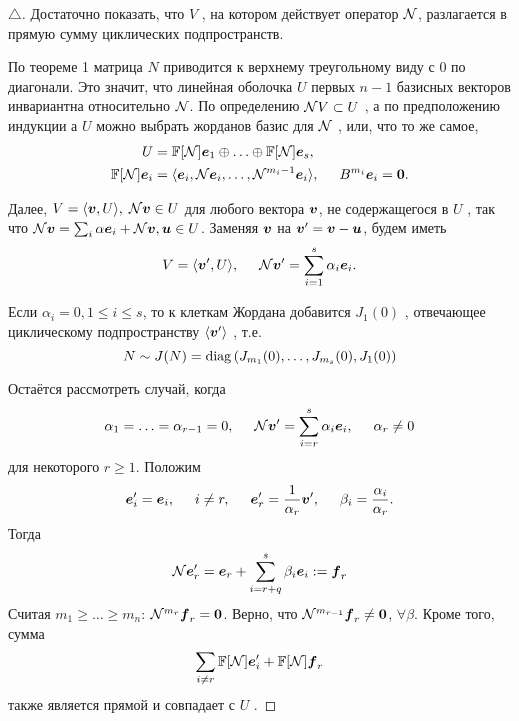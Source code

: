 \begin{proof}[$\triangle$]
    Достаточно показать, что $V$ , на котором действует оператор $\mathcal N$, разлагается в прямую сумму циклических подпространств.

    По теореме 1 матрица $N$ приводится к верхнему треугольному виду с 0 по диагонали. Это значит, что линейная оболочка $U$ первых $n-1$ базисных векторов инвариантна относительно $\mathcal N$. По определению $\mathcal N V \subset U$ ,  а по предположению индукции а $U$ можно выбрать жорданов базис для $\mathcal N$ , или, что то же самое,
    \begin{align*}
        U &= \mathbb{F}[\mathcal N] \mbox{\boldmath $e$}_1 \oplus \ldots \oplus \mathbb{F}[\mathcal N]\mbox{\boldmath $e$}_s, \\
        \mathbb{F} [\mathcal N] \mbox{\boldmath $e$}_i &= \langle \mbox{\boldmath $e$}_i, \mathcal N \mbox{\boldmath $e$}_i, \ldots, \mathcal N^{m_i - 1} \mbox{\boldmath $e$}_i \rangle, \hspace{0.5cm}  B^{m_i} \mbox{\boldmath $e$}_i = \mbox{\boldmath $0$}.
    \end{align*}

    Далее, $V = \langle \mbox{\boldmath $v$}, U \rangle, \; \mathcal N \mbox{\boldmath $v$} \in U$ для любого вектора $\mbox{\boldmath $v$}$, не содержащегося в $U$ , так что $\mathcal N \mbox{\boldmath $v$} = \sum_i \alpha \mbox{\boldmath $e$}_i + \mathcal N \mbox{\boldmath $v$}, \mbox{\boldmath $u$} \in U$. Заменяя $\mbox{\boldmath $v$}$ на $\mbox{\boldmath $v$}' = \mbox{\boldmath $v$} - \mbox{\boldmath $u$}$, будем иметь
    $$
        V = \langle \mbox{\boldmath $v$}', U\rangle, \hspace{0.5cm} \mathcal N \mbox{\boldmath $v$}' = \sum_{i=1}^{s} \alpha_i \mbox{\boldmath $e$}_i.
    $$

    Если $\alpha_i = 0, 1 \leq i \leq s$, то к клеткам Жордана добавится $J_1 (0)$ , отвечающее циклическому подпространству $\langle \mbox{\boldmath $v$}'\rangle$ , т.е. 
    $$
        N \sim J(N) = \mathop{\mathrm{diag}}\nolimits \left(
            J_{m_{1}} (0), \ldots, J_{m_s} (0), J_{1} (0)
        \right)
    $$

    Остаётся рассмотреть случай, когда
    $$
        \alpha_{1} = \ldots = \alpha_{r-1} = 0, \hspace{0.5cm}  \mathcal N \mbox{\boldmath $v$}' = \sum_{i=r}^s \alpha_i \mbox{\boldmath $e$}_i, \hspace{0.5cm} \alpha_r \neq 0
    $$
    для некоторого $r \geq 1$. Положим
    $$
        \mbox{\boldmath $e$}_i' = \mbox{\boldmath $e$}_i, \hspace{0.5cm}  
        i \neq r, \hspace{0.5cm}   
        \mbox{\boldmath $e$}'_r = \frac{1}{\alpha_r} \mbox{\boldmath $v$}', \hspace{0.5cm} 
        \beta_i = \frac{\alpha_i}{\alpha_r}.
    $$
    Тогда
    $$
        \mathcal N \mbox{\boldmath $e$}_r' = \mbox{\boldmath $e$}_r + \sum_{i=r+q}^s \beta_i \mbox{\boldmath $e$}_i := \mbox{\boldmath $f$}_r
    $$
    Считая $m_{1} \geq \ldots \geq m_n$: $\mathcal N^{m_r} \mbox{\boldmath $f$}_r = \mbox{\boldmath $0$}$. Верно, что $\mathcal N^{m_{r-1}} \mbox{\boldmath $f$}_r \neq \mbox{\boldmath $0$}$, $\forall \beta$. Кроме того, сумма
    $$
        \sum_{i \neq r} \mathbb{F}[\mathcal N] \mbox{\boldmath $e$}_i' + \mathbb{F}[\mathcal N] \mbox{\boldmath $f$}_r
    $$
    также является прямой и совпадает с $U$ .


\end{proof}
